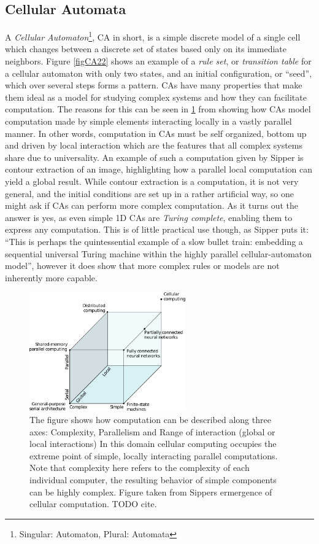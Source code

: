 \subsection{Cellular Automata}
A \emph{Cellular Automaton}\footnote{Singular: Automaton, Plural: Automata}, CA
in short, is a simple discrete model of a single cell which changes between a
discrete set of states based only on its immediate neighbors.
Figure \ref{figCA22} shows an example of a \emph{rule set}, or \emph{transition
  table} for a cellular automaton with only two states, and an initial
configuration, or ``seed'', which over several steps forms a pattern.
%
CAs have many properties that make them ideal as a model for studying complex
systems and how they can facilitate computation.
The reasons for this can be seen in \ref{figSipperClass} from
\cite{sipper_emergence_1999}
showing how CAs model computation made by simple elements interacting locally in
a vastly parallel manner.
%
In other words, computation in CAs must be self organized, bottom up and driven by
local interaction which are the features that all complex systems share due to
universality.
%
An example of such a computation given by Sipper is contour extraction of an
image, highlighting how a parallel local computation can yield a global result.
%
While contour extraction is a computation, it is not very general, and the initial
conditions are set up in a rather artificial way, so one might ask if CAs can
perform more complex computation.
As it turns out the answer is yes, as even simple 1D CAs are \emph{Turing
  complete}, enabling them to express any computation.
This is of little practical use though, as Sipper puts it: ``This is perhaps the
quintessential example of a slow bullet train: embedding a sequential universal
Turing machine within the highly parallel cellular-automaton model'', however it
does show that more complex rules or models are not inherently more capable.
\begin{figure}[h!]
  \centering
  \includegraphics[width=0.6\textwidth]{fig/sipperComp.png}
  \caption{
    The figure shows how computation can be described along three axes:
    Complexity, Parallelism and Range of interaction (global or local
    interactions)
    In this domain cellular computing occupies the extreme point of simple,
    locally interacting parallel computations.
    Note that complexity here refers to the complexity of each individual
    computer, the resulting behavior of simple components can be highly complex.
    Figure taken from Sippers ermergence of cellular computation.
    TODO cite.
    }
  \label{figSipperClass}
\end{figure}
